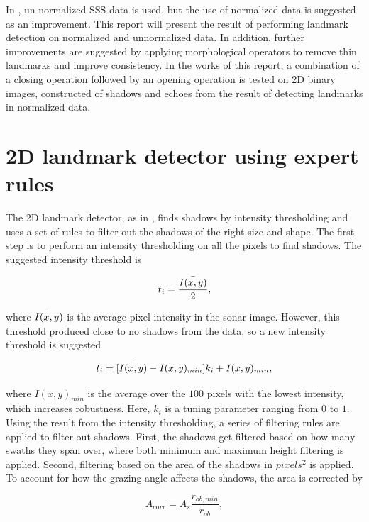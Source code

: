 In \cite{Al-Rawi2017LandmarkImages}, un-normalized SSS data is used, but the use of normalized data is suggested as an improvement. This report will present the result of performing landmark detection on normalized and unnormalized data. In addition, further improvements are suggested by applying morphological operators to remove thin landmarks and improve consistency. In the works of this report, a combination of a closing operation followed by an opening operation is tested on 2D binary images, constructed of shadows and echoes from the result of detecting landmarks in normalized data. 

\section{2D landmark detector using expert rules}

The 2D landmark detector, as in \cite{Leblond2019SonarProject}, finds shadows by intensity thresholding and uses a set of rules to filter out the shadows of the right size and shape. The first step is to perform an intensity thresholding on all the pixels to find shadows. The suggested intensity threshold is

\begin{equation}
    t_i = \frac{\Bar{I(x,y)}}{2},
    \label{eq:orginal_int_thres}
\end{equation}

where $\Bar{I(x,y)}$ is the average pixel intensity in the sonar image. However, this threshold produced close to no shadows from the data, so a new intensity threshold is suggested

\begin{equation}
    t_i = [\Bar{I(x,y)} - I(x,y)_{min}] k_i + I(x,y)_{min},
\end{equation}

where $I(x,y)_{min}$ is the average over the $100$ pixels with the lowest intensity, which increases robustness. Here, $k_i$ is a tuning parameter ranging from $0$ to $1$. Using the result from the intensity thresholding, a series of filtering rules are applied to filter out shadows. First, the shadows get filtered based on how many swaths they span over, where both minimum and maximum height filtering is applied. Second, filtering based on the area of the shadows in $pixels^2$ is applied. To account for how the grazing angle affects the shadows, the area is corrected by

\begin{equation}
    A_{corr} = A_s \frac{r_{ob,min}}{r_{ob}},
    \label{eq:corrected_area}
\end{equation}

